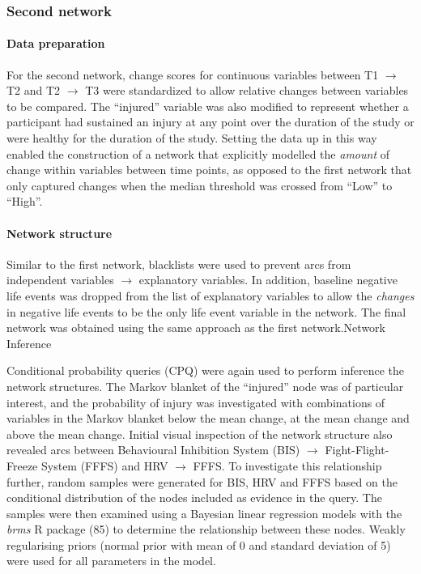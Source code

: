 \documentclass[
  english,
  man]{apa6}
\let\oldparagraph\paragraph
\renewcommand{\paragraph}[1]{\oldparagraph{#1}\mbox{}}
\begin{document}
\hypertarget{second-network}{%
\subsubsection{Second network}\label{second-network}}

\hypertarget{data-preparation-1}{%
\paragraph{Data preparation}\label{data-preparation-1}}

For the second network, change scores for continuous variables between T1 \(\rightarrow\) T2 and T2 \(\rightarrow\) T3 were standardized to allow relative changes between variables to be compared.
The ``injured'' variable was also modified to represent whether a participant had sustained an injury at any point over the duration of the study or were healthy for the duration of the study.
Setting the data up in this way enabled the construction of a network that explicitly modelled the \emph{amount} of change within variables between time points, as opposed to the first network that only captured changes when the median threshold was crossed from ``Low'' to ``High''.

\hypertarget{network-structure-1}{%
\paragraph{Network structure}\label{network-structure-1}}

Similar to the first network, blacklists were used to prevent arcs from independent variables \(\rightarrow\) explanatory variables.
In addition, baseline negative life events was dropped from the list of explanatory variables to allow the \emph{changes} in negative life events to be the only life event variable in the network.
The final network was obtained using the same approach as the first network.Network Inference

Conditional probability queries (CPQ) were again used to perform inference the network structures.
The Markov blanket of the ``injured'' node was of particular interest, and the probability of injury was investigated with combinations of variables in the Markov blanket below the mean change, at the mean change and above the mean change.
Initial visual inspection of the network structure also revealed arcs between Behavioural Inhibition System (BIS) \(\rightarrow\) Fight-Flight-Freeze System (FFFS) and HRV \(\rightarrow\) FFFS.
To investigate this relationship further, random samples were generated for BIS, HRV and FFFS based on the conditional distribution of the nodes included as evidence in the query.
The samples were then examined using a Bayesian linear regression models with the \emph{brms} R package (85) to determine the relationship between these nodes.
Weakly regularising priors (normal prior with mean of 0 and standard deviation of 5) were used for all parameters in the model.
\end{document}
